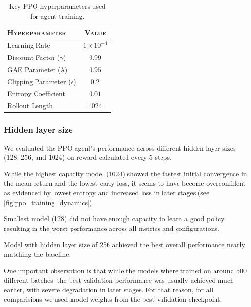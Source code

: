 \documentclass{article}
\theoremstyle{plain}
\theoremstyle{definition}
\theoremstyle{remark}
\begin{document}
\begin{table}[tb]
    \vskip 0.15in
    \begin{center}
        \begin{small}
            \begin{tabular}{lc}
                \toprule
                \textsc{Hyperparameter} & \textsc{Value} \\
                \midrule
                Learning Rate & $1 \times 10^{-4}$ \\
                Discount Factor ($\gamma$) & $0.99$ \\
                GAE Parameter ($\lambda$) & $0.95$ \\
                Clipping Parameter ($\epsilon$) & $0.2$ \\
                Entropy Coefficient & $0.01$ \\
                Rollout Length & $1024$ \\
                \bottomrule
            \end{tabular}
        \end{small}
    \end{center}
    \caption{Key PPO hyperparameters used for agent training.}
    \label{tab:ppo-hyperparameters}
    \vskip -0.1in
\end{table}

\subsubsection{Hidden layer size}

We evaluated the PPO agent's performance across different hidden layer sizes (128, 256, and 1024) on reward calculated every 5 steps.

While the highest capacity model (1024) showed the fastest initial convergence in the mean return and the lowest early loss, it seems to have become overconfident as evidenced by lowest entropy and increased loss in later stages (see \cref{fig:ppo_training_dynamics}).

Smallest model (128) did not have enough capacity to learn a good policy resulting in the worst performance across all metrics and configurations.

Model with hidden layer size of 256 achieved the best overall performance nearly matching the baseline.

One important observation is that while the models where trained on around 500 different batches, the best validation performance was usually achieved much earlier, with severe degradation in later stages. For that reason, for all comparisions we used model weights from the best validation checkpoint.
\end{document}
